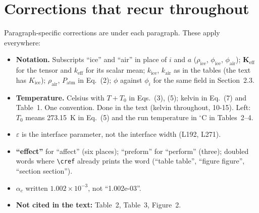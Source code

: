 \documentclass[11pt]{article}
\newcommand{\add}[1]{\textcolor{revX}{#1}}
\providecommand{\cref}[1]{\texttt{\detokenize{#1}}}
\begin{document}
\section*{Corrections that recur throughout}
Paragraph-specific corrections are under each paragraph. These apply
everywhere:
\begin{itemize}
\item \textbf{Notation.} Subscripts ``ice'' and ``air'' in place of $i$ and
  $a$ ($\rho_{\mathrm{ice}}$, $\phi_{\mathrm{ice}}$, $\phi_{\mathrm{air}}$);
  $\mathbf{K}_{\mathrm{eff}}$ for the tensor and $k_{\mathrm{eff}}$ for its
  scalar mean; $k_{\mathrm{ice}}$, $k_{\mathrm{air}}$ as in the tables (the
  text has $K_{\mathrm{ice}}$); $\rho_{\mathrm{air}}$, $P_{\mathrm{atm}}$ in
  Eq.~(2); $\phi$ against $\phi_i$ for the same field in Section~2.3.
\item \textbf{Temperature.} Celsius with $T + T_0$ in Eqs.~(3), (5); kelvin
  in Eq.~(7) and Table~1. One convention.
  \add{Done in the text (kelvin throughout, 10-15). Left: $T_0$ means
  273.15~K in Eq.~(5) and the run temperature in $^{\circ}$C in
  Tables~2--4.}
\item \textbf{$\varepsilon$} is the interface parameter, not the interface
  width (L192, L271).
\item \textbf{``effect''} for ``affect'' (six places); ``preform'' for
  ``perform'' (three); doubled words where \verb|\cref| already prints the
  word (``table table'', ``figure figure'', ``section section'').
\item \textbf{$\alpha_c$} written $1.002\times10^{-3}$, not ``1.002e-03''.
\item \textbf{Not cited in the text:} Table~2, Table~3, Figure~2.
\end{itemize}
\end{document}
